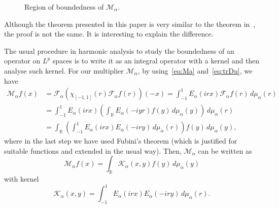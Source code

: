 \documentclass[a4paper]{amsart}
\numberwithin{equation}{section}
\theoremstyle{plain}
\theoremstyle{remark}
\newcommand{\R}{\mathbb{R}}
\newcommand{\Fa}{\mathcal{F}_\alpha} %
\newcommand{\Ma}{\mathcal{M}_\alpha} %
\newcommand{\Ka}{\mathcal{K}_\alpha} %
\newcommand{\mua}{\mu_\alpha}
\begin{document}
\begin{figure}[ht]
\centering
{}
\caption{Region of boundedness of $\Ma$.}
\label{fig:a1/p}
\end{figure}

Although the theorem presented in this paper is very similar to the theorem in~\cite{BCV}, 
the proof is not the same. It is interesting to explain the difference.

The usual procedure in harmonic analysis to study the boundedness of an operator on $L^p$ spaces 
is to write it as an integral operator with a kernel and then analyse such kernel. 
For our multiplier $\Ma$, by using~\eqref{eq:Ma} and~\eqref{eq:trDu}, we have
\begin{align*}
  \Ma f(x) &= \Fa(\chi_{[-1,1]}(r) \Fa f(r))(-x)
  = \int_{-1}^1 E_\alpha(irx) \Fa f(r)\,d\mua(r) \\
  &= \int_{-1}^1 E_\alpha(irx)
    \left( \int_\R E_\alpha(-iyr) f(y) \,d\mua(y) \right) \,d\mua(r) \\
  &= \int_{\R} \left( \int_{-1}^1 E_\alpha(irx) E_\alpha(-iry)\,d\mua(r) \right)
    f(y) \,d\mua(y),
\end{align*}
where in the last step we have used Fubini's theorem 
(which is justified for suitable functions and extended in the usual way). 
Then, $\Ma$ can be written as
\begin{equation}
\label{eq:MaKa}
  \Ma f(x) = \int_{\R} \Ka(x,y) f(y) \,d\mua(y)
\end{equation}
with kernel
\begin{equation}
\label{eq:Kaint}
  \Ka(x,y) = \int_{-1}^1 E_\alpha(irx) E_\alpha(-iry)\,d\mua(r).
\end{equation}
\end{document}
